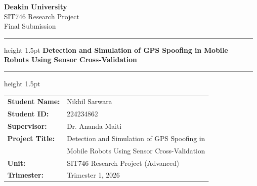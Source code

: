 \documentclass[12pt,a4paper]{article}
\begin{document}
\begin{titlepage}
    \centering
    \vspace*{1cm}
    {\Large \textbf{Deakin University}} \\[0.3cm]
    {\large SIT746 Research Project} \\[0.1cm]
    {\large Final Submission} \\[1.5cm]
    \hrule height 1.5pt
    \vspace{0.5cm}
    {\LARGE \textbf{Detection and Simulation of GPS Spoofing in Mobile Robots Using Sensor Cross-Validation}} \\[0.5cm]
    \hrule height 1.5pt
    \vspace{1.5cm}
    \begin{tabular}{@{}ll}
        \textbf{Student Name:}   & Nikhil Sarwara \\
        \textbf{Student ID:}     & 224234862 \\
        \textbf{Supervisor:}     & Dr. Ananda Maiti \\
        \textbf{Project Title:}  & Detection and Simulation of GPS Spoofing in \\
        & Mobile Robots Using Sensor Cross-Validation \\
        \textbf{Unit:}           & SIT746 Research Project (Advanced) \\
        \textbf{Trimester:}      & Trimester 1, 2026 \\
    \end{tabular}
    \vfill
\end{titlepage}

\newpage
\tableofcontents
\newpage

\newpage
\listoffigures
\newpage

\newpage
\listoftables
\newpage


\newpage


\newpage


\newpage


\newpage


\newpage


\newpage


\newpage


\end{document}

